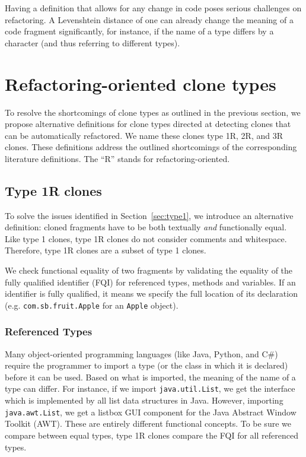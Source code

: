 Having a definition that allows for any change in code poses serious challenges on refactoring. A Levenshtein distance of one can already change the meaning of a code fragment significantly, for instance, if the name of a type differs by a character (and thus referring to different types).

\section{Refactoring-oriented clone types}\label{sec:rtypes}
To resolve the shortcomings of clone types as outlined in the previous section, we propose alternative definitions for clone types directed at detecting clones that can be automatically refactored. We name these clones type 1R, 2R, and 3R clones. These definitions address the outlined shortcomings of the corresponding literature definitions. The ``R'' stands for refactoring-oriented.

\subsection{Type 1R clones} \label{sec:type1r}
To solve the issues identified in Section~\ref{sec:type1}, we introduce an alternative definition: cloned fragments have to be both textually \textit{and} functionally equal. Like type 1 clones, type 1R clones do not consider comments and whitespace. Therefore, type 1R clones are a subset of type 1 clones.

We check functional equality of two fragments by validating the equality of the fully qualified identifier (FQI) for referenced types, methods and variables. If an identifier is fully qualified, it means we specify the full location of its declaration (e.g. \texttt{com.sb.fruit.Apple} for an \texttt{Apple} object).

\subsubsection{Referenced Types}
Many object-oriented programming languages (like Java, Python, and C\#) require the programmer to import a type (or the class in which it is declared) before it can be used. Based on what is imported, the meaning of the name of a type can differ. For instance, if we import \texttt{java.util.List}, we get the interface which is implemented by all list data structures in Java. However, importing \texttt{java.awt.List}, we get a listbox GUI component for the Java Abstract Window Toolkit (AWT). These are entirely different functional concepts. To be sure we compare between equal types, type 1R clones compare the FQI for all referenced types.

